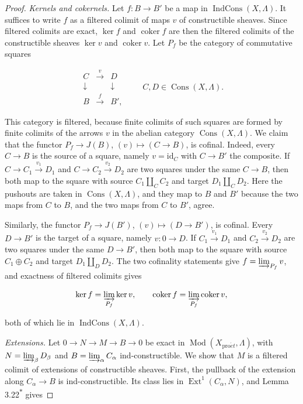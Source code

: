 \documentclass[11pt]{article}
\newcommand{\bpout}[1]{#1\textsuperscript{\hyperlink{bp-outside}{\ensuremath{\ast}}}}
\providecommand{\Cons}{}\renewcommand{\Cons}{\operatorname{Cons}}
\providecommand{\Ext}{}\renewcommand{\Ext}{\operatorname{Ext}}
\providecommand{\IndCons}{}\renewcommand{\IndCons}{\operatorname{IndCons}}
\providecommand{\coker}{}\renewcommand{\coker}{\operatorname{coker}}
\begin{document}
\begin{proof}[{Proof}]
\emph{Kernels and cokernels.} Let \(f:B\to B'\) be a map in \(\IndCons(X,\Lambda)\). It suffices to write \(f\) as a filtered colimit of maps \(v\) of constructible sheaves. Since filtered colimits are exact, \(\ker f\) and \(\coker f\) are then the filtered colimits of the constructible sheaves \(\ker v\) and \(\coker v\). Let \(P_f\) be the category of commutative squares

\[
\begin{matrix} C&\xrightarrow{v}&D\\
\downarrow&&\downarrow\\ B&\xrightarrow{f}&B',\end{matrix}
\qquad C,D\in\Cons(X,\Lambda).
\]

This category is filtered, because finite colimits of such squares are formed by finite colimits of the arrows \(v\) in the abelian category \(\Cons(X,\Lambda)\). We claim that the functor \(P_f\to J(B)\), \((v)\mapsto(C\to B)\), is cofinal. Indeed, every \(C\to B\) is the source of a square, namely \(v=\mathrm{id}_C\) with \(C\to B'\) the composite. If \(C\to C_1\xrightarrow{v_1}D_1\) and \(C\to C_2\xrightarrow{v_2}D_2\) are two squares under the same \(C\to B\), then both map to the square with source \(C_1\amalg_CC_2\) and target \(D_1\amalg_CD_2\). Here the pushouts are taken in \(\Cons(X,\Lambda)\), and they map to \(B\) and \(B'\) because the two maps from \(C\) to \(B\), and the two maps from \(C\) to \(B'\), agree.

Similarly, the functor \(P_f\to J(B')\), \((v)\mapsto(D\to B')\), is cofinal. Every \(D\to B'\) is the target of a square, namely \(v:0\to D\). If \(C_1\xrightarrow{v_1}D_1\) and \(C_2\xrightarrow{v_2}D_2\) are two squares under the same \(D\to B'\), then both map to the square with source \(C_1\oplus C_2\) and target \(D_1\amalg_DD_2\). The two cofinality statements give \(f=\varinjlim_{P_f}v\), and exactness of filtered colimits gives

\[
\ker f=\varinjlim_{P_f}\ker v,\qquad
\coker f=\varinjlim_{P_f}\coker v,
\]

both of which lie in \(\IndCons(X,\Lambda)\).

\emph{Extensions.} Let \(0\to N\to M\to B\to0\) be exact in \(\operatorname{Mod}(X_{\mathrm{pro}\acute{e}t},\Lambda)\), with \(N=\varinjlim_\beta D_\beta\) and \(B=\varinjlim_\alpha C_\alpha\) ind-constructible. We show that \(M\) is a filtered colimit of extensions of constructible sheaves. First, the pullback of the extension along \(C_\alpha\to B\) is ind-constructible. Its class lies in \(\Ext^1(C_\alpha,N)\), and Lemma \bpout{3.22} gives


\end{proof}
\end{document}

